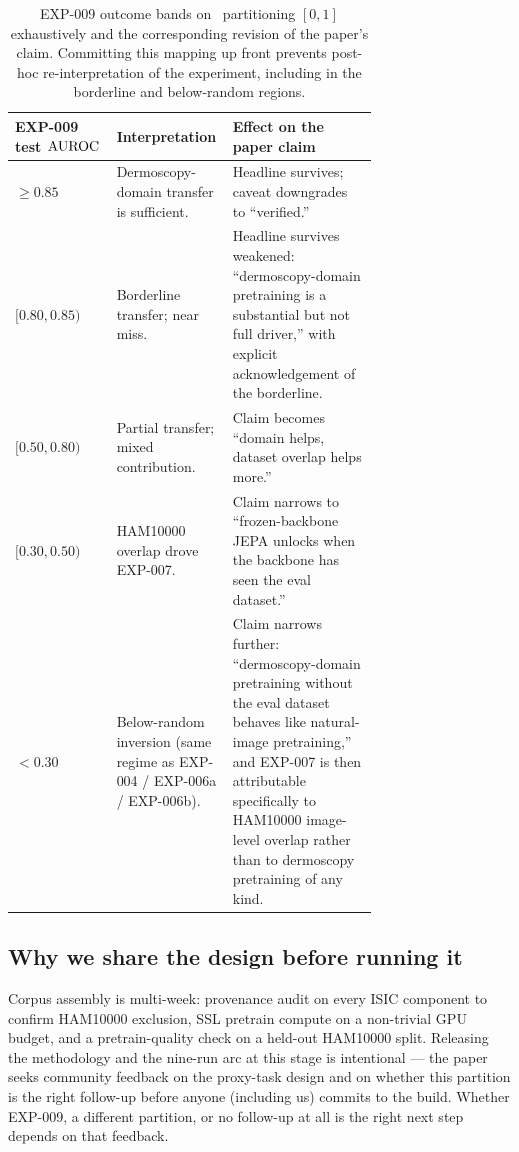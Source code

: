 \begin{table}[h]
\centering
\small
\setlength{\tabcolsep}{4pt}
\begin{tabular}{@{}lp{0.32\linewidth}p{0.40\linewidth}@{}}
\toprule
EXP-009 test $\mathrm{AUROC}$ & Interpretation & Effect on the paper claim \\
\midrule
$\geq 0.85$    & Dermoscopy-domain transfer is sufficient. & Headline survives; caveat downgrades to ``verified.'' \\
$[0.80, 0.85)$ & Borderline transfer; near miss. & Headline survives weakened: ``dermoscopy-domain pretraining is a substantial but not full driver,'' with explicit acknowledgement of the borderline. \\
$[0.50, 0.80)$ & Partial transfer; mixed contribution. & Claim becomes ``domain helps, dataset overlap helps more.'' \\
$[0.30, 0.50)$ & HAM10000 overlap drove EXP-007. & Claim narrows to ``frozen-backbone JEPA unlocks when the backbone has seen the eval dataset.'' \\
$< 0.30$       & Below-random inversion (same regime as EXP-004 / EXP-006a / EXP-006b). & Claim narrows further: ``dermoscopy-domain pretraining without the eval dataset behaves like natural-image pretraining,'' and EXP-007 is then attributable specifically to HAM10000 image-level overlap rather than to dermoscopy pretraining of any kind. \\
\bottomrule
\end{tabular}
\caption{EXP-009 outcome bands on \strongholdtwo\ partitioning $[0,1]$
exhaustively and the corresponding revision of the paper's claim.
Committing this mapping up front prevents post-hoc re-interpretation of
the experiment, including in the borderline and below-random regions.}
\label{tab:exp009-decision}
\end{table}

\subsection{Why we share the design before running it}
Corpus assembly is multi-week: provenance audit on every ISIC component
to confirm HAM10000 exclusion, SSL pretrain compute on a non-trivial
GPU budget, and a pretrain-quality check on a held-out HAM10000 split.
Releasing the methodology and the nine-run arc at this stage is
intentional --- the paper seeks community feedback on the proxy-task
design and on whether this partition is the right follow-up before
anyone (including us) commits to the build. Whether EXP-009, a
different partition, or no follow-up at all is the right next step
depends on that feedback.

